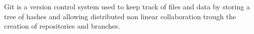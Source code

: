 Git is a version control system used to keep track of files and data by storing a tree of hashes and allowing distributed non linear collaboration trough the creation of repositories and branches.